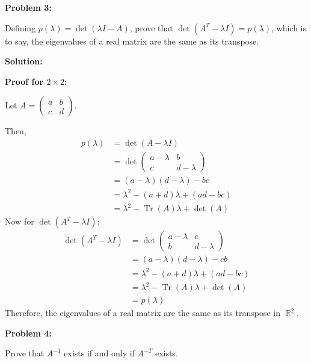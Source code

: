 \documentclass[12pt]{article}
\DeclareMathOperator{\Tr}{Tr}
\DeclareMathOperator{\RR}{\mathbb{R}}
\newenvironment{problem}[1]{
    \textbf{Problem #1:}
}{
    \rmfamily \vspace{1em}
}
\newenvironment{solution}{
    \textbf{Solution:}
    
}{
    
    \vspace{2em}
}
\begin{document}
\begin{problem}{3}
    Defining \(p(\lambda) = \det(\lambda I - A)\), prove that \(\det(A^T - \lambda I) = p(\lambda)\), which is to say, the eigenvalues of a real matrix are the same as its transpose.
\end{problem}

\begin{solution}
    \textbf{Proof for \(2 \times 2\):}

    Let \(A = \begin{pmatrix}
        a & b \\
        c & d
    \end{pmatrix}\).

    Then,
    \[
        \begin{aligned}
            p(\lambda) &= \det(A - \lambda I)\\
            &= \det\begin{pmatrix}
                a - \lambda & b \\
                c & d - \lambda
            \end{pmatrix}\\
            &= (a - \lambda)(d - \lambda) - bc\\
            &= \lambda^2 - (a+d)\lambda + (ad - bc)\\
            &= \lambda^2 - \Tr(A)\lambda + \det(A)
        \end{aligned}
    \]
    Now for \(\det(A^T - \lambda I)\):
    \[
        \begin{aligned}
            \det(A^T - \lambda I) &= \det\begin{pmatrix}
                a - \lambda & c  \\
                b & d - \lambda
            \end{pmatrix}\\
            &= (a - \lambda)(d - \lambda) - cb\\
            &= \lambda^2 - (a+d)\lambda + (ad - bc)\\
            &= \lambda^2 - \Tr(A)\lambda + \det(A)\\
            &= p(\lambda)
        \end{aligned}
    \]
    Therefore, the eigenvalues of a real matrix are the same as its transpose in \(\RR^2\).

    
\end{solution}

\begin{problem}{4}
    Prove that \(A^{-1}\) exists if and only if \(A^{-T}\) exists.
\end{problem}
\end{document}
